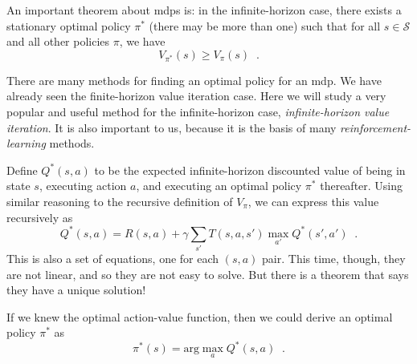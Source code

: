 An important theorem about {\sc mdp}s is: in the infinite-horizon case, there exists a stationary
optimal policy $\pi^*$ (there may be more than one) such that for all
$s \in \mathcal S$ and all other policies $\pi$, we have 
\begin{equation}
 V_{\pi^*}(s) \ge V_{\pi}(s) \;\;.
\end{equation}


There are many methods for finding an optimal policy for an {\sc mdp}.
We have already seen the finite-horizon value iteration case.  Here we
will study a very popular and useful method for the infinite-horizon
case, {\em infinite-horizon value iteration}.  It is also important to
us, because it is the basis of many {\em reinforcement-learning}
methods.

Define $Q^*(s, a)$ to be the expected infinite-horizon discounted
value of being in state $s$, executing action $a$, and executing
an optimal  policy $\pi^*$ thereafter.  Using similar reasoning to the
recursive definition  of  $V_\pi$,  we can express this value
recursively as
\begin{equation}
 Q^*(s, a) = R(s, a) + \gamma\sum_{s'}T(s, a, s')\max_{a'}Q^*(s',
a') \;\;.
\end{equation} 
This is also a set of equations, one for each $(s, a)$ pair.  This
time, though, they are not linear, and so they are not easy to solve.
But there is a theorem  that says they have a unique solution!

If we knew the optimal action-value function, then  we could derive an
optimal policy  $\pi^*$ as
\begin{equation}
 \pi^*(s) = \text{arg}\max_{a}Q^*(s, a) \;\;.
\end{equation}

